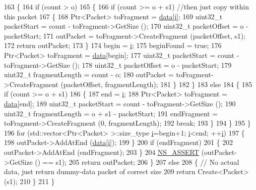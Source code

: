 \begin{DoxyCode}
163             \{
164               \textcolor{keywordflow}{if} (count > o)
165                 \{
166                   \textcolor{keywordflow}{if} (count >= o + s1) \textcolor{comment}{//then just copy within this packet}
167                     \{
168                       Ptr<Packet> toFragment = \hyperlink{classns3_1_1PendingData_ab6ccbe1d5ca0d4536e4ad454971eb460}{data}[\hyperlink{bernuolliDistribution_8m_a6f6ccfcf58b31cb6412107d9d5281426}{i}];
169                       uint32\_t packetStart = count - toFragment->GetSize ();
170                       uint32\_t packetOffset = o - packetStart;
171                       outPacket = toFragment->CreateFragment (packetOffset, s1);
172                       \textcolor{keywordflow}{return} outPacket;
173                     \}
174                   begin = \hyperlink{bernuolliDistribution_8m_a6f6ccfcf58b31cb6412107d9d5281426}{i};
175                   beginFound = \textcolor{keyword}{true};
176                   Ptr<Packet> toFragment = \hyperlink{classns3_1_1PendingData_ab6ccbe1d5ca0d4536e4ad454971eb460}{data}[begin];
177                   uint32\_t packetStart = count - toFragment->GetSize ();
178                   uint32\_t packetOffset = o - packetStart;
179                   uint32\_t fragmentLength = count - o;
180                   outPacket = toFragment->CreateFragment (packetOffset, fragmentLength);
181                 \}
182             \}
183           \textcolor{keywordflow}{else}
184             \{
185               \textcolor{keywordflow}{if} (count >= o + s1)
186                 \{
187                   end = \hyperlink{bernuolliDistribution_8m_a6f6ccfcf58b31cb6412107d9d5281426}{i};
188                   Ptr<Packet> toFragment = \hyperlink{classns3_1_1PendingData_ab6ccbe1d5ca0d4536e4ad454971eb460}{data}[end];
189                   uint32\_t packetStart = count - toFragment->GetSize ();
190                   uint32\_t fragmentLength = o + s1 - packetStart;
191                   endFragment = toFragment->CreateFragment (0, fragmentLength);
192                   \textcolor{keywordflow}{break};
193                 \}
194             \}
195         \}
196       \textcolor{keywordflow}{for} (std::vector<Ptr<Packet> >::size\_type \hyperlink{bernuolliDistribution_8m_a6f6ccfcf58b31cb6412107d9d5281426}{i}=begin+1; \hyperlink{bernuolliDistribution_8m_a6f6ccfcf58b31cb6412107d9d5281426}{i}<end; ++\hyperlink{bernuolliDistribution_8m_a6f6ccfcf58b31cb6412107d9d5281426}{i})
197         \{
198           outPacket->AddAtEnd (\hyperlink{classns3_1_1PendingData_ab6ccbe1d5ca0d4536e4ad454971eb460}{data}[\hyperlink{bernuolliDistribution_8m_a6f6ccfcf58b31cb6412107d9d5281426}{i}]);
199         \}
200       \textcolor{keywordflow}{if} (endFragment)
201         \{
202           outPacket->AddAtEnd (endFragment);
203         \}
204       \hyperlink{assert_8h_a6dccdb0de9b252f60088ce281c49d052}{NS\_ASSERT} (outPacket->GetSize () == s1);
205       \textcolor{keywordflow}{return} outPacket;
206     \}
207   \textcolor{keywordflow}{else}
208     \{ \textcolor{comment}{// No actual data, just return dummy-data packet of correct size}
209       \textcolor{keywordflow}{return} Create<Packet> (s1);
210     \}
211 \}
\end{DoxyCode}


